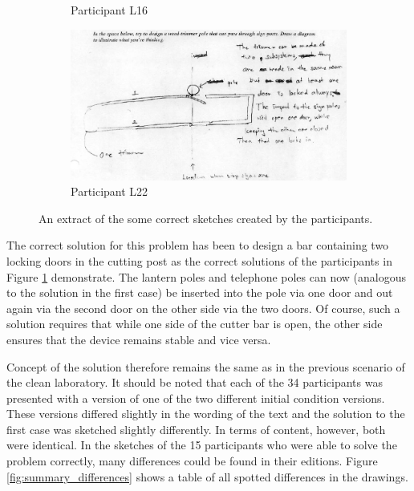 \documentclass[12pt]{article}
\begin{document}
\begin{figure}[h!]
\begin{subfigure}[b]{0.3\linewidth}
    \caption{Participant L16}
  \end{subfigure}
  \begin{subfigure}[b]{0.3\linewidth}
    \includegraphics[width=\linewidth]{images/drawing_l22_con2.PNG}
    \caption{Participant L22}
  \end{subfigure}
  \caption{An extract of the some correct sketches created by the participants. \protect\cite{davies2009computational}}
  \label{fig:drawing_l24_con2}
\end{figure}

The correct solution for this problem has been to design a bar containing two locking doors in the cutting post as the correct solutions of the participants in Figure \ref{fig:drawing_l24_con2} demonstrate. The lantern poles and telephone poles can now (analogous to the solution in the first case) be inserted into the pole via one door and out again via the second door on the other side via the two doors. Of course, such a solution requires that while one side of the cutter bar is open, the other side ensures that the device remains stable and vice versa. 

Concept of the solution therefore remains the same as in the previous scenario of the clean laboratory. It should be noted that each of the 34 participants was presented with a version of one of the two different initial condition versions. These versions differed slightly in the wording of the text and the solution to the first case was sketched slightly differently. In terms of content, however, both were identical. In the sketches of the 15 participants who were able to solve the problem correctly, many differences could be found in their editions. Figure \ref{fig:summary_differences} shows a table of all spotted differences in the drawings. 
\end{document}
